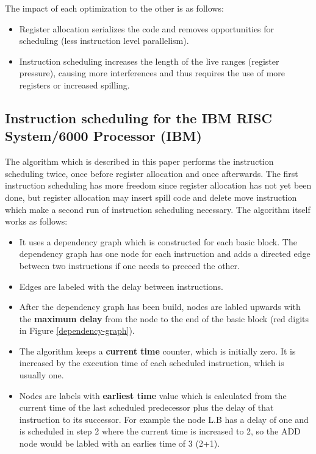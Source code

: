 \documentclass[a4paper,10pt]{article}
\begin{document}
The impact of each optimization to the other is as follows:
\begin{itemize}
 \item Register allocation serializes the code and removes opportunities for scheduling (less instruction level parallelism).
 \item Instruction scheduling increases the length of the live ranges (register pressure), causing more interferences and thus requires
       the use of more registers or increased spilling.
\end{itemize}

\subsection{Instruction scheduling for the IBM RISC System/6000 Processor (IBM)}
The algorithm which is described in this paper performs the instruction scheduling twice, once before register allocation and once
afterwards. The first instruction scheduling has more freedom since register allocation has not yet been done, but register allocation
may insert spill code and delete move instruction which make a second run of instruction scheduling necessary. The algorithm itself works
as follows:
\begin{itemize}
 \item It uses a dependency graph which is constructed for each basic block. The dependency graph has one node for each instruction and
       adds a directed edge between two instructions if one needs to preceed the other.
 \item Edges are labeled with the delay between instructions.
 \item After the dependency graph has been build, nodes are labled upwards with the \textbf{maximum delay} from the node to the end of
       the basic block (red digits in Figure \ref{dependency-graph}).
 \item The algorithm keeps a \textbf{current time} counter, which is initially zero. It is increased by the execution time of each
       scheduled instruction, which is usually one.
 \item Nodes are labels with \textbf{earliest time} value which is calculated from the current time of the last scheduled predecessor
       plus the delay of that instruction to its successor. For example the node L.B has a delay of one and is scheduled in step 2 where
       the current time is increased to 2, so the ADD node would be labled with an earlies time of 3 (2+1).
\end{itemize}
\end{document}
